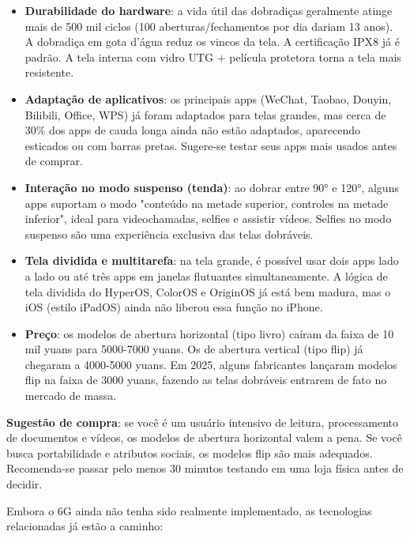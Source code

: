 \begin{itemize}
  \item \textbf{Durabilidade do hardware}: a vida útil das dobradiças geralmente atinge mais de 500 mil ciclos (100 aberturas/fechamentos por dia dariam 13 anos). A dobradiça em gota d'água reduz os vincos da tela. A certificação IPX8 já é padrão. A tela interna com vidro UTG + película protetora torna a tela mais resistente.
  \item \textbf{Adaptação de aplicativos}: os principais apps (WeChat, Taobao, Douyin, Bilibili, Office, WPS) já foram adaptados para telas grandes, mas cerca de 30\% dos apps de cauda longa ainda não estão adaptados, aparecendo esticados ou com barras pretas. Sugere-se testar seus apps mais usados antes de comprar.
  \item \textbf{Interação no modo suspenso (tenda)}: ao dobrar entre 90° e 120°, alguns apps suportam o modo "conteúdo na metade superior, controles na metade inferior", ideal para videochamadas, selfies e assistir vídeos. Selfies no modo suspenso são uma experiência exclusiva das telas dobráveis.
  \item \textbf{Tela dividida e multitarefa}: na tela grande, é possível usar dois apps lado a lado ou até três apps em janelas flutuantes simultaneamente. A lógica de tela dividida do HyperOS, ColorOS e OriginOS já está bem madura, mas o iOS (estilo iPadOS) ainda não liberou essa função no iPhone.
  \item \textbf{Preço}: os modelos de abertura horizontal (tipo livro) caíram da faixa de 10 mil yuans para 5000-7000 yuans. Os de abertura vertical (tipo flip) já chegaram a 4000-5000 yuans. Em 2025, alguns fabricantes lançaram modelos flip na faixa de 3000 yuans, fazendo as telas dobráveis entrarem de fato no mercado de massa.
\end{itemize}

\textbf{Sugestão de compra}: se você é um usuário intensivo de leitura, processamento de documentos e vídeos, os modelos de abertura horizontal valem a pena. Se você busca portabilidade e atributos sociais, os modelos flip são mais adequados. Recomenda-se passar pelo menos 30 minutos testando em uma loja física antes de decidir.


Embora o 6G ainda não tenha sido realmente implementado, as tecnologias relacionadas já estão a caminho:

